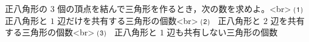 正八角形の $3$ 個の頂点を結んで三角形を作るとき，次の数を求めよ。<br>
⑴　正八角形と $1$ 辺だけを共有する三角形の個数<br>
⑵　正八角形と $2$ 辺を共有する三角形の個数<br>
⑶　正八角形と $1$ 辺も共有しない三角形の個数
